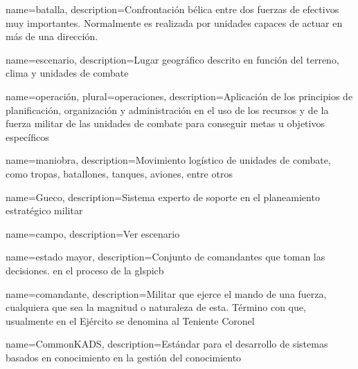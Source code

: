 

 {
  name={batalla},
  description={Confrontación bélica entre dos fuerzas de efectivos
               muy importantes. Normalmente es realizada por unidades
               capaces de actuar en más de una dirección.}
}

 {
  name={escenario},
  description={Lugar geográfico descrito en función del terreno,
               clima y unidades de combate}
}

 {
  name={operación},
  plural={operaciones},
  description={Aplicación de los principios de planificación,
               organización y administración en el uso de los recursos
               y de la fuerza militar de las unidades de combate
               para conseguir metas u objetivos específicos}
}

 {
  name={maniobra},
  description={Movimiento logístico de unidades de combate, como tropas,
               batallones, tanques, aviones, entre otros}
}

 {
  name={Gueco},
  description={Sistema experto de soporte en el planeamiento estratégico militar}
}

 {
  name={campo},
  description={Ver \gls{escenario}}
}

 {
  name={estado mayor},
  description={Conjunto de comandantes que toman las decisiones.
               en el proceso de la glspicb}
}

 {
  name={comandante},
  description={Militar que ejerce el mando de una fuerza, cualquiera que sea
               la magnitud o naturaleza de esta. Término con que, usualmente
               en el Ejército se denomina al Teniente Coronel}
}

 {
  name={CommonKADS},
  description={Estándar para el desarrollo de sistemas basados en conocimiento
               en la gestión del conocimiento}
}

